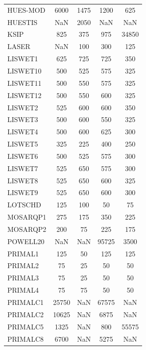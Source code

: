 \begin{longtable}{lcccc}
HUES-MOD &     6000 &  1475 &     1200 &      625 \\
HUESTIS  &      NaN &  2050 &      NaN &      NaN \\
KSIP     &      825 &   375 &      975 &    34850 \\
LASER    &      NaN &   100 &      300 &      125 \\
LISWET1  &      625 &   725 &      725 &      350 \\
LISWET10 &      500 &   525 &      575 &      325 \\
LISWET11 &      500 &   550 &      575 &      325 \\
LISWET12 &      500 &   550 &      600 &      325 \\
LISWET2  &      525 &   600 &      600 &      350 \\
LISWET3  &      500 &   600 &      550 &      325 \\
LISWET4  &      500 &   600 &      625 &      300 \\
LISWET5  &      325 &   225 &      400 &      250 \\
LISWET6  &      500 &   525 &      575 &      300 \\
LISWET7  &      525 &   650 &      575 &      300 \\
LISWET8  &      525 &   650 &      600 &      325 \\
LISWET9  &      525 &   650 &      600 &      300 \\
LOTSCHD  &      125 &   100 &       50 &       75 \\
MOSARQP1 &      275 &   175 &      350 &      225 \\
MOSARQP2 &      200 &    75 &      225 &      175 \\
POWELL20 &      NaN &   NaN &    95725 &     3500 \\
PRIMAL1  &      125 &    50 &      125 &      125 \\
PRIMAL2  &       75 &    25 &       50 &       50 \\
PRIMAL3  &       75 &    25 &       50 &       50 \\
PRIMAL4  &       75 &    75 &       50 &       50 \\
PRIMALC1 &    25750 &   NaN &    67575 &      NaN \\
PRIMALC2 &    10625 &   NaN &     6875 &      NaN \\
PRIMALC5 &     1325 &   NaN &      800 &    55575 \\
PRIMALC8 &     6700 &   NaN &     5275 &      NaN \\

\end{longtable}
